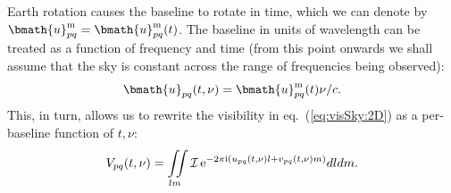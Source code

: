 \documentclass[useAMS,usenatbib]{mn2e}
\newcommand{\ee}{\mathrm{e}}
\newcommand{\ii}{\mathrm{i}}
\begin{document}
\label{sec:AvgCon}
Earth rotation causes the baseline to rotate in time, which we can denote by
$\bmath{u}^\mathrm{m}_{pq}=\bmath{u}^\mathrm{m}_{pq}(t)$. The baseline in units of wavelength 
can be treated as a function of frequency and time (from this point onwards we shall assume that the sky is constant across the
range of frequencies being observed):
\begin{equation}
\label{eq:uvtf}
\bmath{u}_{pq}(t,\nu) = \bmath{u}^\mathrm{m}_{pq}(t)\nu/c.
\end{equation} 
This, in turn, allows us to rewrite the visibility in eq.~(\ref{eq:visSky:2D}) as a per-baseline function of $t,\nu$:
\begin{equation}
V_{pq}(t,\nu)=\iint\limits_{lm} \II\,\ee^{-2\pi\ii(u_{pq}(t,\nu)l+v_{pq}(t,\nu)m)}dldm. 
\label{eq:visSky:2Dtf}
\end{equation} 
\end{document}
